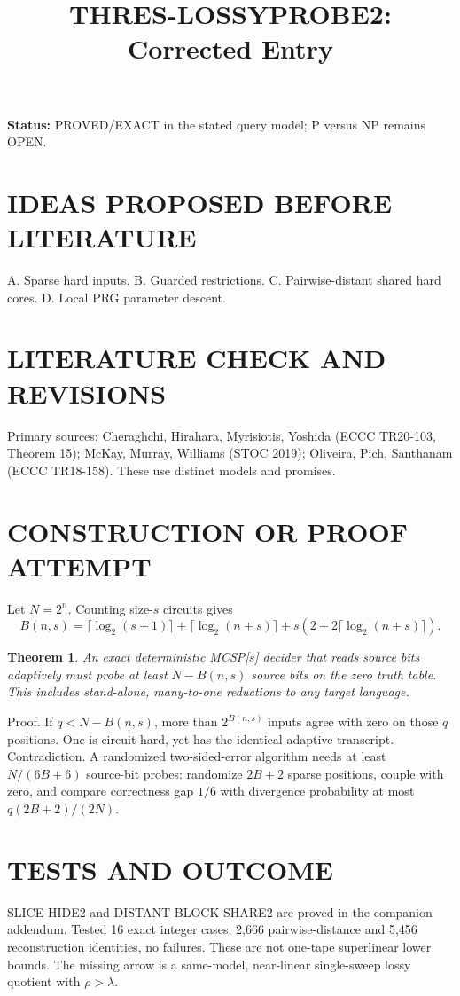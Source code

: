 \documentclass{article}
\title{THRES-LOSSYPROBE2: Corrected Entry}
\newtheorem{theorem}{Theorem}
\begin{document}
\maketitle
\noindent\textbf{Status:} PROVED/EXACT in the stated query model;
P versus NP remains OPEN.
\section{IDEAS PROPOSED BEFORE LITERATURE}
A. Sparse hard inputs. B. Guarded restrictions.
C. Pairwise-distant shared hard cores. D. Local PRG parameter descent.
\section{LITERATURE CHECK AND REVISIONS}
Primary sources: Cheraghchi, Hirahara, Myrisiotis, Yoshida
(ECCC TR20-103, Theorem 15); McKay, Murray, Williams
(STOC 2019); Oliveira, Pich, Santhanam (ECCC TR18-158).
These use distinct models and promises.
\section{CONSTRUCTION OR PROOF ATTEMPT}
Let $N=2^n$. Counting size-$s$ circuits gives
\[
 B(n,s)=\lceil\log_2(s+1)\rceil+
 \lceil\log_2(n+s)\rceil+
 s(2+2\lceil\log_2(n+s)\rceil).
\]
\begin{theorem}
An exact deterministic MCSP[$s$] decider that
reads source bits adaptively must probe at least
$N-B(n,s)$ source bits on the zero truth table.
This includes stand-alone, many-to-one reductions
to any target language.
\end{theorem}
\noindent Proof. If $q<N-B(n,s)$, more than
$2^{B(n,s)}$ inputs agree with zero on those
$q$ positions. One is circuit-hard, yet has
the identical adaptive transcript. Contradiction.
A randomized two-sided-error algorithm needs at
least $N/(6B+6)$ source-bit probes: randomize
$2B+2$ sparse positions, couple with zero, and
compare correctness gap $1/6$ with divergence
probability at most $q(2B+2)/(2N)$.
\section{TESTS AND OUTCOME}
SLICE-HIDE2 and DISTANT-BLOCK-SHARE2 are proved
in the companion addendum. Tested 16 exact
integer cases, 2,666 pairwise-distance and
5,456 reconstruction identities, no failures.
These are not one-tape superlinear lower bounds.
The missing arrow is a same-model, near-linear
single-sweep lossy quotient with $\rho>\lambda$.
\end{document}
